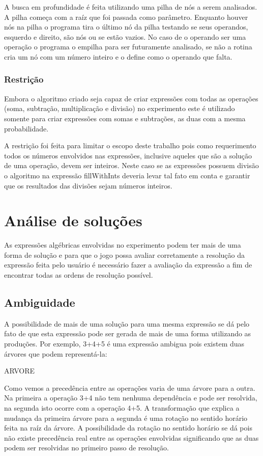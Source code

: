 	A busca em profundidade é feita utilizando uma pilha de nós a serem analisados. A pilha começa com a raíz que foi passada como parâmetro. Enquanto houver nós na pilha o programa tira o último nó da pilha testando se seus operandos, esquerdo e direito, são nós ou se estão vazios. No caso de o operando ser uma operação o programa o empilha para ser futuramente analisado, se não a rotina cria um nó com um número inteiro e o define como o operando que falta.
	
\subsubsection{Restrição}
Embora o algoritmo criado seja capaz de criar expressões com todas as operações (soma, subtração, multiplicação e divisão) no experimento este é utilizado somente para criar expressões com somas e subtrações, as duas com a mesma probabilidade.

	A restrição foi feita para limitar o escopo deste trabalho pois como requerimento todos os números envolvidos nas expressões, inclusive aqueles que são a solução de uma operação, devem ser inteiros. Neste caso se as expressões possuem divisão o algoritmo na expressão fillWithInts deveria levar tal fato em conta e garantir que os resultados das divisões sejam números inteiros.
	
\section{Análise de soluções}
As expressões algébricas envolvidas no experimento podem ter mais de uma forma de solução e para que o jogo possa avaliar corretamente a resolução da expressão feita pelo usuário é necessário fazer a avaliação da expressão a fim de encontrar todas as ordens de resolução possível.

\subsection{Ambiguidade}
A possibilidade de mais de uma solução para uma mesma expressão se dá pelo fato de que esta expressão pode ser gerada de mais de uma forma utilizando as produções. Por exemplo, 3+4+5 é uma expressão ambigua pois existem duas árvores que podem representá-la:

ARVORE
     
Como vemos a precedência entre as operações varia de uma árvore para a outra. Na primeira a operação 3+4 não tem nenhuma dependência e pode ser resolvida, na segunda isto ocorre com a operação 4+5. A transformação que explica a mudança da primeira árvore para a segunda é uma rotação no sentido horário feita na raíz da árvore. A possibilidade da rotação no sentido horário se dá pois não existe precedência real entre as operações envolvidas significando que as duas podem ser resolvidas no primeiro passo de resolução.

